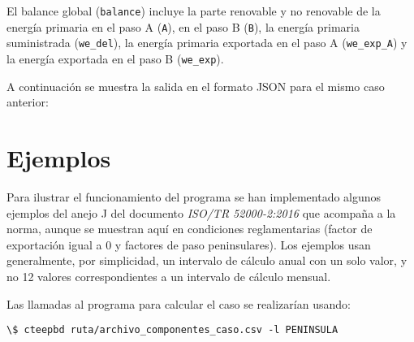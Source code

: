 \documentclass[10pt,notitlepage,oneside,a4paper]{article}
\begin{document}
El balance global (\texttt{balance}) incluye la parte renovable y no renovable de la energía primaria en el paso A (\texttt{A}), en el paso B (\texttt{B}), la energía primaria suministrada (\texttt{we\_del}), la energía primaria exportada en el paso A (\texttt{we\_exp\_A}) y la energía exportada en el paso B (\texttt{we\_exp}).

A continuación se muestra la salida en el formato JSON para el mismo caso anterior:



\clearpage
\newpage


\setcounter{section}{0} %
\renewcommand\thesection{Anexo~\Roman{section}}
\renewcommand\theHsection{Anexo~\Roman{section}}
\renewcommand\thesubsection{\Roman{section}.\arabic{subsection}}
\renewcommand\theHsubsection{\Roman{section}.\arabic{subsection}}
\renewcommand{\thefigure}{\Roman{section}.\arabic{figure}}
\renewcommand{\theHfigure}{\Roman{section}.\arabic{figure}}
\renewcommand{\thetable}{\Roman{section}.\arabic{table}}
\renewcommand{\theHtable}{\Roman{section}.\arabic{table}}

\section{Ejemplos}
\label{sec:anexoejemplos}
\setcounter{figure}{0} %
\setcounter{table}{0} %

Para ilustrar el funcionamiento del programa se han implementado algunos ejemplos del anejo J del documento \textit{ISO/TR 52000-2:2016} que acompaña a la norma, aunque se muestran aquí en condiciones reglamentarias (factor de exportación igual a 0 y factores de paso peninsulares). Los ejemplos usan generalmente, por simplicidad, un intervalo de cálculo anual con un solo valor, y no 12 valores correspondientes a un intervalo de cálculo mensual.

Las llamadas al programa para calcular el caso se realizarían usando:

\begin{Verbatim}[fontsize=\small]
    \$ cteepbd ruta/archivo_componentes_caso.csv -l PENINSULA
\end{Verbatim}
\end{document}
